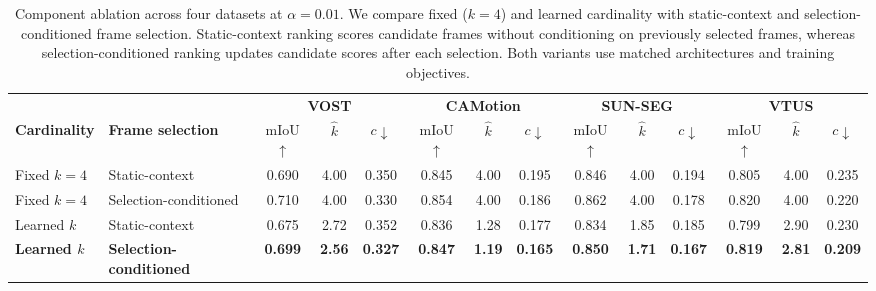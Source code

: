 \begin{table}[t]
\centering
\caption{Component ablation across four datasets at
$\alpha=0.01$. We compare fixed ($k=4$) and learned
cardinality with static-context and selection-conditioned
frame selection. Static-context ranking scores candidate
frames without conditioning on previously selected frames,
whereas selection-conditioned ranking updates candidate
scores after each selection. Both variants use matched
architectures and training objectives.}
\label{tab:component_ablation_four_datasets}
\small
\setlength{\tabcolsep}{2pt}
\begin{tabular}{@{}ll*{4}{ccc}@{}}
\toprule
& & \multicolumn{3}{c}{\textbf{VOST}} & \multicolumn{3}{c}{\textbf{CAMotion}} & \multicolumn{3}{c}{\textbf{SUN-SEG}} & \multicolumn{3}{c}{\textbf{VTUS}} \\
\cmidrule(lr){3-5}\cmidrule(lr){6-8}\cmidrule(lr){9-11}\cmidrule(lr){12-14}
\textbf{Cardinality} & \textbf{Frame selection}
 & mIoU$\uparrow$ & $\hat{k}$ & $c\downarrow$ & mIoU$\uparrow$ & $\hat{k}$ & $c\downarrow$ & mIoU$\uparrow$ & $\hat{k}$ & $c\downarrow$ & mIoU$\uparrow$ & $\hat{k}$ & $c\downarrow$ \\
\midrule
Fixed $k=4$ & Static-context & 0.690 & 4.00 & 0.350 & 0.845 & 4.00 & 0.195 & 0.846 & 4.00 & 0.194 & 0.805 & 4.00 & 0.235 \\
Fixed $k=4$ & Selection-conditioned & 0.710 & 4.00 & 0.330 & 0.854 & 4.00 & 0.186 & 0.862 & 4.00 & 0.178 & 0.820 & 4.00 & 0.220 \\
\midrule
Learned $k$ & Static-context & 0.675 & 2.72 & 0.352 & 0.836 & 1.28 & 0.177 & 0.834 & 1.85 & 0.185 & 0.799 & 2.90 & 0.230 \\
\textbf{Learned $k$} & \textbf{Selection-conditioned} & \textbf{0.699} & \textbf{2.56} & \textbf{0.327} & \textbf{0.847} & \textbf{1.19} & \textbf{0.165} & \textbf{0.850} & \textbf{1.71} & \textbf{0.167} & \textbf{0.819} & \textbf{2.81} & \textbf{0.209} \\
\bottomrule
\end{tabular}
\end{table}
